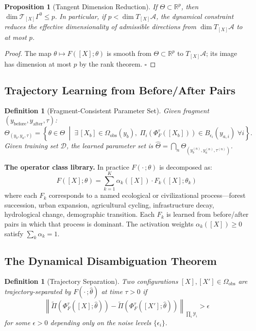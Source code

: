 \documentclass[12pt, oneside]{article}
\newtheorem{proposition}[theorem]{Proposition}
\newtheorem{definition}[theorem]{Definition}
\newcommand{\Ftil}{\widetilde{\Pi}}
\begin{document}
\begin{proposition}[Tangent Dimension Reduction]
If $\Theta \subset \mathbb{R}^p$, then $\dim \mathcal{T}_{[X]}\Gamma^0 \le p$.
In particular, if $p < \dim T_{[X]}\mathcal{A}$, the dynamical constraint reduces the
effective dimensionality of admissible directions from $\dim T_{[X]}\mathcal{A}$ to
at most $p$.
\end{proposition}
\begin{proof}
The map $\theta \mapsto F([X];\theta)$ is smooth from $\Theta \subset \mathbb{R}^p$ to
$T_{[X]}\mathcal{A}$; its image has dimension at most $p$ by the rank theorem. $\square$
\end{proof}

\subsection{Trajectory Learning from Before/After Pairs}

\begin{definition}[Fragment-Consistent Parameter Set]
Given fragment $(y_{\mathrm{before}}, y_{\mathrm{after}}, \tau)$:
\[
\Theta_{(y_b,y_a,\tau)} = \left\{ \theta \in \Theta \;\middle|\;
\exists\, [X_b] \in \Omega_{\mathrm{obs}}(y_b),\;
\Pi_i(\Phi^\tau_F([X_b])) \in B_{\epsilon_i}(y_{a,i})\; \forall i \right\}.
\]
Given training set $\mathcal{D}$, the learned parameter set is
$\hat{\Theta} = \bigcap_{n} \Theta_{(y_b^{(n)}, y_a^{(n)}, \tau^{(n)})}$.
\end{definition}

\textbf{The operator class library.} In practice $F(\cdot\,;\theta)$ is decomposed as:
\[
F([X];\theta) = \sum_{k=1}^K \alpha_k([X]) \cdot F_k([X];\theta_k)
\]
where each $F_k$ corresponds to a named ecological or civilizational process---forest
succession, urban expansion, agricultural cycling, infrastructure decay, hydrological
change, demographic transition. Each $F_k$ is learned from before/after pairs in which
that process is dominant. The activation weights $\alpha_k([X]) \ge 0$ satisfy
$\sum_k \alpha_k = 1$.

\subsection{The Dynamical Disambiguation Theorem}

\begin{definition}[Trajectory Separation]
Two configurations $[X],[X'] \in \Omega_{\mathrm{obs}}$ are \emph{trajectory-separated} by
$F(\cdot\,;\hat{\theta})$ at time $\tau > 0$ if
\[
\left\| \Ftil(\Phi^\tau_F([X];\hat{\theta})) - \Ftil(\Phi^\tau_F([X'];\hat{\theta}))
\right\|_{\prod_i \mathcal{Y}_i} > \epsilon
\]
for some $\epsilon > 0$ depending only on the noise levels $\{\epsilon_i\}$.
\end{definition}
\end{document}
